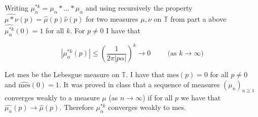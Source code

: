 \documentclass{article}
\begin{document}
Writing $\mu_\alpha^{\ast k} = \mu_\alpha \ast \dots \ast \mu_\alpha$ and using recursively the property $\widehat{\mu \ast \nu} \left ( p \right ) = \widehat{\mu} \left ( p \right ) \widehat{\nu} \left ( p \right )$ for two measures $\mu, \nu$ on $\mathbb{T}$ from part a above $\widehat{\mu_\alpha^{\ast k}} \left ( 0 \right ) = 1$ for all $k$. For $p \neq 0$ I have that

\begin{equation}
	\left | \mu_\alpha^{\ast k} \left ( p \right ) \right | \leq \left ( \frac{1}{2 \pi \left | p \alpha \right |} \right ) ^ k \rightarrow 0 \hspace{1cm} \text{(as $k \rightarrow \infty$)}
\end{equation}

Let $\text{mes}$ be the Lebesgue measure on $\mathbb{T}$. I have that $\widehat{\text{mes}} \left ( p \right ) = 0$ for all $p \neq 0$ and $\widehat{\text{mes}} \left ( 0 \right ) = 1$. It was proved in class that a sequence of measures $\left ( \mu_n \right )_{n \geq 1}$ converges weakly to a measure $\mu$ (as $n \rightarrow \infty$) if for all $p$ we have that $\widehat{\mu_n} \left ( p \right ) \rightarrow \widehat{\mu} \left ( p \right ) $. Therefore $\mu_\alpha^{\ast k}$ converges weakly to $\text{mes}$. 
\end{document}
